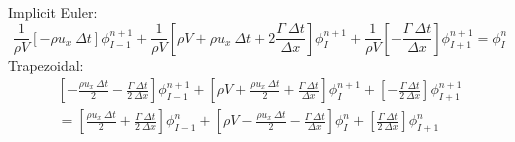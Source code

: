\documentclass[12pt]{article}
\begin{document}
Implicit Euler:
\begin{equation*}
    \frac{1}{\rho V}\left[ -\rho u_x\: \Delta t \right]\phi_{I-1}^{n+1} + \frac{1}{\rho V}\left[ \rho V + \rho u_x\: \Delta t + 2\frac{\Gamma\: \Delta t}{\Delta x} \right]\phi_{I}^{n+1} + \frac{1}{\rho V}\left[ -\frac{\Gamma\: \Delta t}{\Delta x} \right]\phi_{I+1}^{n+1} = \phi_{I}^{n}
\end{equation*}
Trapezoidal:
\begin{multline*}
    \left[ -\frac{\rho u_x\: \Delta t}{2} - \frac{\Gamma\: \Delta t}{2\: \Delta x} \right]\phi_{I-1}^{n+1} + \left[ \rho V + \frac{\rho u_x\: \Delta t}{2} + \frac{\Gamma\: \Delta t}{\Delta x} \right]\phi_{I}^{n+1} + \left[ -\frac{\Gamma\: \Delta t}{2\: \Delta x} \right]\phi_{I+1}^{n+1}\\
    = \left[ \frac{\rho u_x\: \Delta t}{2} + \frac{\Gamma\: \Delta t}{2\: \Delta x} \right]\phi_{I-1}^{n} + \left[ \rho V - \frac{\rho u_x\: \Delta t}{2} - \frac{\Gamma\: \Delta t}{\Delta x} \right]\phi_{I}^{n} + \left[ \frac{\Gamma\: \Delta t}{2\: \Delta x} \right]\phi_{I+1}^{n}
\end{multline*}
\end{document}
